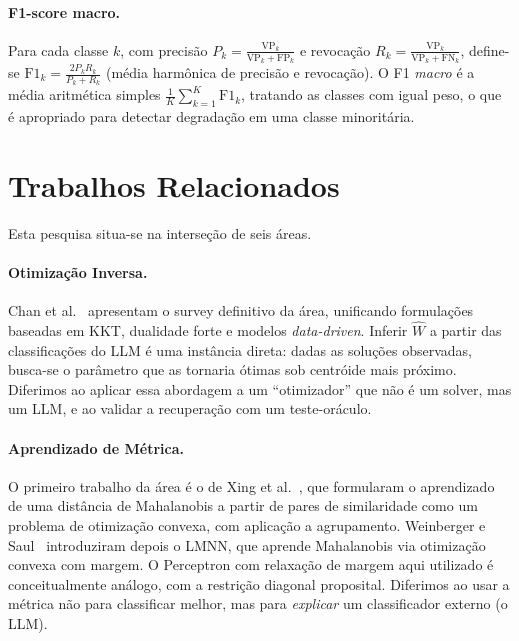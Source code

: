 \documentclass[12pt,a4paper]{article}
\newcommand{\West}{\ensuremath{\hat{W}}}   %
\begin{document}
\paragraph{F1-score macro.} Para cada classe $k$, com precisão
$P_k = \frac{\text{VP}_k}{\text{VP}_k + \text{FP}_k}$ e revocação
$R_k = \frac{\text{VP}_k}{\text{VP}_k + \text{FN}_k}$, define-se
$\text{F1}_k = \frac{2 P_k R_k}{P_k + R_k}$ (média harmônica de precisão e revocação). O
F1 \emph{macro} é a média aritmética simples $\frac{1}{K}\sum_{k=1}^K \text{F1}_k$, tratando
as classes com igual peso, o que é apropriado para detectar degradação em uma classe
minoritária.

\section{Trabalhos Relacionados}
\label{sec:relacionados}

Esta pesquisa situa-se na interseção de seis áreas.

\paragraph{Otimização Inversa.}
Chan et al.~\cite{chanInverseOptimization2025} apresentam o survey definitivo da área,
unificando formulações baseadas em KKT, dualidade forte e modelos \emph{data-driven}. Inferir
\West{} a partir das classificações do LLM é uma instância direta: dadas as soluções
observadas, busca-se o parâmetro que as tornaria ótimas sob centróide mais próximo. Diferimos
ao aplicar essa abordagem a um ``otimizador'' que não é um solver, mas um LLM, e ao
validar a recuperação com um teste-oráculo.

\paragraph{Aprendizado de Métrica.}
O primeiro trabalho da área é o de Xing et al.~\cite{xingDistanceMetric2002}, que
formularam o aprendizado de uma distância de Mahalanobis a partir de pares de
similaridade como um problema de otimização convexa, com aplicação a agrupamento.
Weinberger e Saul~\cite{weinbergerDistanceMetric2009} introduziram depois o LMNN, que
aprende
Mahalanobis via otimização convexa com margem. O Perceptron com relaxação de margem aqui
utilizado é
conceitualmente análogo, com a restrição diagonal proposital. Diferimos ao usar a métrica
não para classificar melhor, mas para \emph{explicar} um classificador externo (o LLM).
\end{document}
